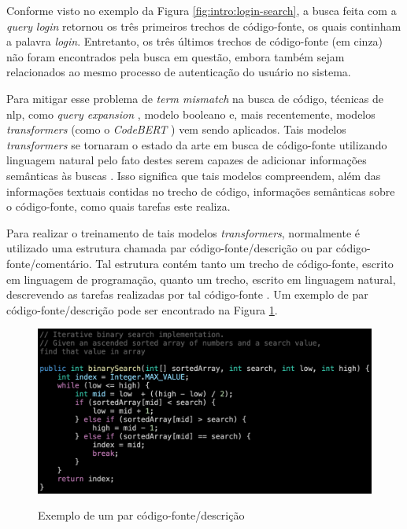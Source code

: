 Conforme visto no exemplo da Figura \ref{fig:intro:login-search}, a busca feita com a \textit{query} \textit{login} retornou os três primeiros trechos de código-fonte, os quais continham a palavra \textit{login}. Entretanto, os três últimos trechos de código-fonte (em cinza) não foram encontrados pela busca em questão, embora também sejam relacionados ao mesmo processo de autenticação do usuário no sistema.

Para mitigar esse problema de \textit{term mismatch} na busca de código, técnicas de \gls{nlp}, como \textit{query expansion} \cite{Nie2016QueryEB}, modelo booleano \cite{lv2015codehow} e, mais recentemente, modelos \textit{transformers} (como o \textit{CodeBERT} \cite{Feng2020CodeBERTAP}) vem sendo aplicados. Tais modelos \textit{transformers} se tornaram o estado da arte em busca de código-fonte utilizando linguagem natural pelo fato destes serem capazes de adicionar informações semânticas às buscas \cite{Guo2021GraphCodeBERTPC}. Isso significa que tais modelos compreendem, além das informações textuais contidas no trecho de código, informações semânticas sobre o código-fonte, como quais tarefas este realiza.

Para realizar o treinamento de tais modelos \textit{transformers}, normalmente é utilizado uma estrutura chamada par código-fonte/descrição ou par código-fonte/comentário. Tal estrutura contém tanto um trecho de código-fonte, escrito em linguagem de programação, quanto um trecho, escrito em linguagem natural, descrevendo as tarefas realizadas por tal código-fonte \cite{Gu2021CRaDLeDC} \cite{Yao2019CoaCorCA}. Um exemplo de par código-fonte/descrição pode ser encontrado na Figura \ref{fig:intro:code-description-pair}.

\begin{figure}[H]
  \centering
  \caption{Exemplo de um par código-fonte/descrição}
  \includegraphics[width=\textwidth,keepaspectratio=true]{./imagens/intro/code-desc-pair.png}
  \label{fig:intro:code-description-pair}
\end{figure}

